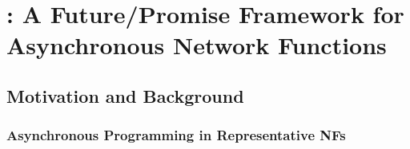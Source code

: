\chapter {\netstar: A Future/Promise Framework for Asynchronous Network Functions}
\label{ch:netstar}

\section{Motivation and Background}

\subsection {Asynchronous Programming in Representative NFs}
\label{sec:bro}

